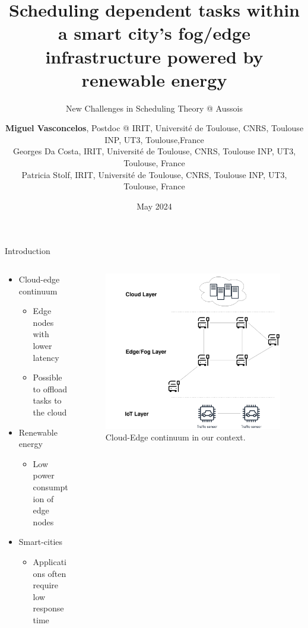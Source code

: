 \documentclass[Ligatures=TeX,table,svgnames,usetotalslideindicator,compress,10pt,aspectratio=169]{beamer}
\title{Scheduling dependent tasks within a smart city's fog/edge infrastructure powered by renewable energy}
\subtitle{ New Challenges in Scheduling Theory @ Aussois}
\author{\textbf{Miguel Vasconcelos}, Postdoc @ IRIT, Université de Toulouse, CNRS, Toulouse INP, UT3, Toulouse,France\\ 
 Georges Da Costa, IRIT, Université de Toulouse, CNRS, Toulouse INP, UT3, Toulouse, France\\
 Patricia Stolf, IRIT, Université de Toulouse, CNRS, Toulouse INP, UT3, Toulouse, France}
\institute
{
}
\date{May 2024}
\begin{document}
\setlength\abovecaptionskip{-3pt}

\frame{\titlepage}

\begin{frame}{Introduction}
\begin{columns}        
\begin{column}{0.5\textwidth}
  \begin{itemize}    
  \item Cloud-edge continuum
  \begin{itemize}
      \item Edge nodes with lower latency
      \item Possible to offload tasks to the cloud
  \end{itemize}
  \item Renewable energy
  \begin{itemize}
      \item Low power consumption of edge nodes
  \end{itemize}
  \item Smart-cities
  \begin{itemize}
      \item Applications often require low response time 
  \end{itemize}
  
  
 \end{itemize} 

\end{column}        
\begin{column}{0.5\textwidth}
      \begin{figure}[!h]
        \centering
        \includegraphics[width=\textwidth]{images/infrastructure.png}
        \caption{Cloud-Edge continuum in our context.}
      \end{figure}
    \end{column}        
\end{columns}


\end{frame}
\end{document}
